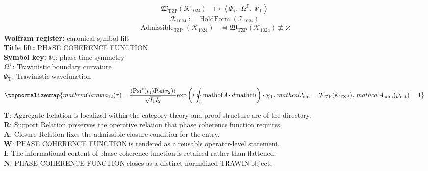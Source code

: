 \noindent
\begin{minipage}[t]{0.48\linewidth}
\begingroup
\small
\[
\begin{aligned}
\mathfrak{W}_{\mathrm{TZP}}\!\left(\mathcal{K}_{1024}\right)
&\longmapsto
\left\langle \Phi_{\tau},\; \Omega^{\mathbb{T}},\; \Psi_{\mathrm{T}} \right\rangle
\end{aligned}
\]
\[
\mathcal{K}_{1024}
:=
\operatorname{HoldForm}\!\left(\mathcal{T}_{1024}\right)
\]
\[
\begin{aligned}
\operatorname{Admissible}_{\mathrm{TZP}}\!\left(\mathcal{K}_{1024}\right)
&\Longleftrightarrow
\mathfrak{W}_{\mathrm{TZP}}\!\left(\mathcal{K}_{1024}\right)\not\equiv\varnothing
\end{aligned}
\]
\textbf{Wolfram register:} canonical symbol lift\\
\textbf{Title lift:} PHASE COHERENCE FUNCTION\\
\textbf{Symbol key:} \(\Phi_{\tau}\): phase-time symmetry\\ \(\Omega^{\mathbb{T}}\): Trawinistic boundary curvature\\ \(\Psi_{\mathrm{T}}\): Trawinistic wavefunction
\par
\endgroup
\end{minipage}\hfill
\begin{minipage}[t]{0.48\linewidth}
\[
\tzpnormalizewrap{mathrm{Gamma}_{12}(\tau) = \frac{\langle \mathrm{Psi}^*(r_1)\mathrm{Psi}(r_2) \rangle}{\sqrt{I_1 I_2}} \exp\left( i \oint_{\mathrm{L}} \mathrm{mathbf}{A} \cdot d\mathrm{mathbf}{l} \right) \cdot \chi_{\mathrm{T}},\,mathcal{J}_{\mathrm{out}} = \mathcal{T}_{\mathrm{TZP}}\!\left(\mathcal{K}_{\mathrm{TZP}}\right),\,mathcal{A}_{\mathrm{adm}}\!\left(\mathcal{J}_{\mathrm{out}}\right)=1}
\]

\small
\textbf{T}: Aggregate Relation is localized within the category theory and proof structure arc of the directory.\\
\textbf{R}: Support Relation preserves the operative relation that phase coherence function requires.\\
\textbf{A}: Closure Relation fixes the admissible closure condition for the entry.\\
\textbf{W}: PHASE COHERENCE FUNCTION is rendered as a reusable operator-level statement.\\
\textbf{I}: The informational content of phase coherence function is retained rather than flattened.\\
\textbf{N}: PHASE COHERENCE FUNCTION closes as a distinct normalized TRAWIN object.
\normalsize
\end{minipage}

